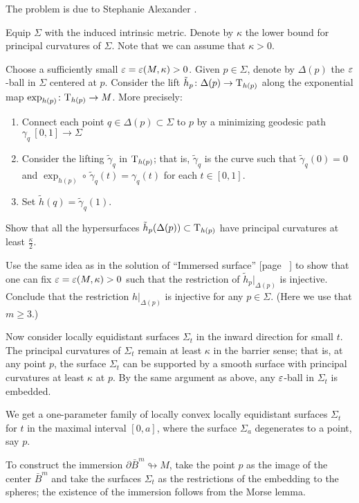 The problem is due to Stephanie Alexander \cite{alexander}.



Equip $\Sigma$ with the induced intrinsic metric.
Denote by $\kappa$ the lower bound for principal curvatures of $\Sigma$.
Note that we can assume that $\kappa>0$.

Choose a sufficiently small $\varepsilon=\varepsilon(M,\kappa)>0$.
Given $p\in \Sigma$, denote by $\Delta(p)$ the $\varepsilon$-ball in $\Sigma$ centered at $p$.
Consider the lift $\tilde h_p\colon\Delta(p)\to \mathrm{T}_{h(p)}$ along the exponential map $\exp_{h(p)}\colon\mathrm{T}_{h(p)}\to M$.
More precisely:
\begin{enumerate}
\item Connect each point $q\in \Delta(p)\subset \Sigma$ to $p$
by a minimizing geodesic  path $\gamma_q\:[0,1]\to \Sigma$
\item Consider the lifting $\tilde\gamma_q$ in $\mathrm{T}_{h(p)}$; 
that is, $\tilde\gamma_q$ is the curve such that $\tilde\gamma_q(0)=0$ 
and $\exp_{h(p)}\circ\,\tilde\gamma_q(t)=\gamma_q(t)$ for each $t\in[0,1]$.
 \item Set $\tilde h(q)=\tilde\gamma_q(1)$.
\end{enumerate}

Show that all the hypersurfaces $\tilde h_p(\Delta(p))\subset \mathrm{T}_{h(p)}$ have principal curvatures at least $\tfrac\kappa2$.

Use the same idea as in the solution of ``Immersed surface'' [page ~\pageref{Immersed surface}] to show that 
one can fix $\eps\z=\eps(M,\kappa)>0$ such that the restriction of $\tilde h_p|_{\Delta(p)}$ is injective.
Conclude that the restriction $h|_{\Delta(p)}$ is injective for any $p\in\Sigma$.
(Here we use that $m\ge 3$.)

Now consider locally equidistant surfaces $\Sigma_t$ in the inward direction for small $t$. 
The principal curvatures of $\Sigma_t$ remain at least $\kappa$ in the barrier sense;
that is, at any point $p$, the surface $\Sigma_t$ can be supported by a smooth surface with principal curvatures at least $\kappa$ at $p$.
By the same argument as above, any $\varepsilon$-ball in $\Sigma_t$ is embedded.

We get a one-parameter family of locally convex locally equidistant surfaces $\Sigma_t$
for $t$ in the maximal interval $[0,a]$,
where the surface $\Sigma_a$ degenerates to a point, say $p$. 

To construct the immersion $\partial \bar B^m\looparrowright M$,
take the point $p$ as the image of the center $\bar B^m$ 
and take the surfaces $\Sigma_t$ as the restrictions of the  embedding to the spheres;
the existence of the immersion follows from the Morse lemma.\qeds

